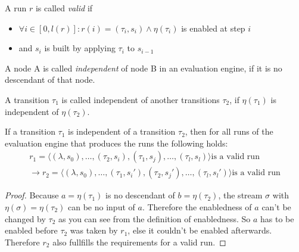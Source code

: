 \begin{definition}[name = Valid Run]\label{def:valid_run}
  A run \(r\) is called \emph{valid} if
  \begin{itemize}
    \item \(\forall i \in [0,l(r)]: r(i) = (\tau_i,s_i) \land \eta(\tau_i)\) is enabled at step \(i\)
    \item and \(s_i\) is built by applying \(\tau_i\) to \(s_{i-1}\)
  \end{itemize}
\end{definition}

\begin{definition}[name = Independence of Nodes]\label{def:node_independent}
  A node A is called \emph{independent} of node B in an evaluation engine, if it is no descendant of that node.
\end{definition}

\begin{definition}[name = Independence of Transitions]\label{def:independence_transitions}
  A transition \(\tau_1\) is called independent of another transitions \(\tau_2\), if \(\eta(\tau_1)\) is independent of \(\eta(\tau_2)\).
\end{definition}

\begin{lemma}[name = Exchange of Independent Transitions]\label{lemma:exchange_independent_transitions}
  If a transition \(\tau_1\) is independent of a transition \(\tau_2\), then for all runs of the evaluation engine that produces the runs the following holds:
  \begin{align*}
    r_1 = \langle (\lambda, s_0), \dots, (\tau_2, s_i), (\tau_1, s_j), \dots, (\tau_l, s_l) \rangle \text{is a valid run} \\
    \rightarrow r_2 = \langle (\lambda, s_0), \dots, (\tau_1, s_i'), (\tau_2, s_j'), \dots, (\tau_l, s_l') \rangle \text{is a valid run}
  \end{align*}
\end{lemma}

\begin{proof}
Because \(a = \eta(\tau_1)\) is no descendant of \(b = \eta(\tau_2)\), the stream \(\sigma\) with \(\eta(\sigma) = \eta(\tau_2)\) can be no input of \(a\).
  Therefore the enabledness of \(a\) can't be changed by \(\tau_2\) as you can see from the definition of enabledness.
  So \(a\) has to be enabled before \(\tau_2\) was taken by \(r_1\), else it couldn't be enabled afterwards.
  Therefore \(r_2\) also fullfills the requirements for a valid run.
\end{proof}

